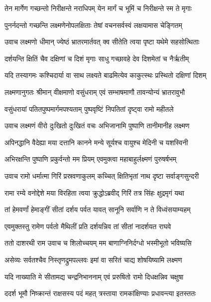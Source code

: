 \twolineshloka
{तेन मार्गेण गच्छन्तो निरीक्षन्ते नराधिपम्}
{येन मार्गं च भूमिं च निरीक्षन्ते स्म ते मृगाः} %

\twolineshloka
{पुनर्नदन्तो गच्छन्ति लक्ष्मणेनोपलक्षिताः}
{तेषां वचनसर्वस्वं लक्षयामास चेङ्गितम्} %

\twolineshloka
{उवाच लक्ष्मणो धीमान् ज्येष्ठं भ्रातरमार्तवत्}
{क्व सीतेति त्वया पृष्टा यथेमे सहसोत्थिताः} %

\twolineshloka
{दर्शयन्ति क्षितिं चैव दक्षिणां च दिशं मृगाः}
{साधु गच्छावहे देव दिशमेतां च नैर्ऋतीम्} %

\twolineshloka
{यदि तस्यागमः कश्चिदार्या वा साथ लक्ष्यते}
{बाढमित्येव काकुत्स्थः प्रस्थितो दक्षिणां दिशम्} %

\twolineshloka
{लक्ष्मणानुगतः श्रीमान् वीक्षमाणो वसुंधराम्}
{एवं सम्भाषमाणौ तावन्योन्यं भ्रातरावुभौ} %

\twolineshloka
{वसुंधरायां पतितपुष्पमार्गमपश्यताम्}
{पुष्पवृष्टिं निपतितां दृष्ट्वा रामो महीतले} %

\twolineshloka
{उवाच लक्ष्मणं वीरो दुःखितो दुःखितं वचः}
{अभिजानामि पुष्पाणि तानीमानीह लक्ष्मण} %

\twolineshloka
{अपिनद्धानि वैदेह्या मया दत्तानि कानने}
{मन्ये सूर्यश्च वायुश्च मेदिनी च यशस्विनी} %

\twolineshloka
{अभिरक्षन्ति पुष्पाणि प्रकुर्वन्तो मम प्रियम्}
{एवमुक्त्वा महाबाहुर्लक्ष्मणं पुरुषर्षभम्} %

\twolineshloka
{उवाच रामो धर्मात्मा गिरिं प्रस्रवणाकुलम्}
{कच्चित् क्षितिभृतां नाथ दृष्टा सर्वाङ्गसुन्दरी} %

\twolineshloka
{रामा रम्ये वनोद्देशे मया विरहिता त्वया}
{क्रुद्धोऽब्रवीद् गिरिं तत्र सिंहः क्षुद्रमृगं यथा} %

\twolineshloka
{तां हेमवर्णां हेमाङ्गीं सीतां दर्शय पर्वत}
{यावत् सानूनि सर्वाणि न ते विध्वंसयाम्यहम्} %

\twolineshloka
{एवमुक्तस्तु रामेण पर्वतो मैथिलीं प्रति}
{दर्शयन्निव तां सीतां नादर्शयत राघवे} %

\twolineshloka
{ततो दाशरथी राम उवाच च शिलोच्चयम्}
{मम बाणाग्निनिर्दग्धो भस्मीभूतो भविष्यसि} %

\twolineshloka
{असेव्यः सर्वतश्चैव निस्तृणद्रुमपल्लवः}
{इमां वा सरितं चाद्य शोषयिष्यामि लक्ष्मण} %

\twolineshloka
{यदि नाख्याति मे सीतामद्य चन्द्रनिभाननाम्}
{एवं प्ररुषितो रामो दिधक्षन्निव चक्षुषा} %

\twolineshloka
{ददर्श भूमौ निष्क्रान्तं राक्षसस्य पदं महत्}
{त्रस्ताया रामकांक्षिण्याः प्रधावन्त्या इतस्ततः} %

